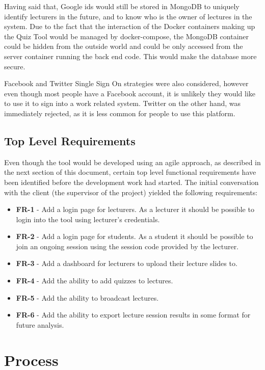 Having said that, Google ids would still be stored in MongoDB to uniquely identify
lecturers in the future, and to know who is the owner of lectures in the system.
Due to the fact that the interaction of the Docker containers making up the Quiz Tool would
be managed by docker-compose, the MongoDB container could be hidden from the outside world
and could be only accessed from the server container running the back end code. This would
make the database more secure.

Facebook and Twitter Single Sign On strategies\cite{facebook}\cite{twitter} were also
considered, however even though most people have a Facebook account, it is unlikely they
would like to use it to sign into a work related system. Twitter on the other hand,
was immediately rejected, as it is less common for people to use this platform.

\subsection{Top Level Requirements}
\label{subsection:toplevel}
Even though the tool would be developed using an agile approach, as described in the next
section of this document, certain top level functional requirements have been identified
before the development work had started. The initial conversation with the client (the
supervisor of the project) yielded the following requirements:

\begin{itemize}
  \item \textbf{FR-1} - Add a login page for lecturers. As a lecturer it should be possible to login
  into the tool using lecturer's credentials.
  \item \textbf{FR-2} - Add a login page for students. As a student it should be possible to join
  an ongoing session using the session code provided by the lecturer.
  \item \textbf{FR-3} - Add a dashboard for lecturers to upload their lecture slides to.
  \item \textbf{FR-4} - Add the ability to add quizzes to lectures.
  \item \textbf{FR-5} - Add the ability to broadcast lectures.
  \item \textbf{FR-6} - Add the ability to export lecture session results in some format
  for future analysis.
\end{itemize}

\section{Process}
